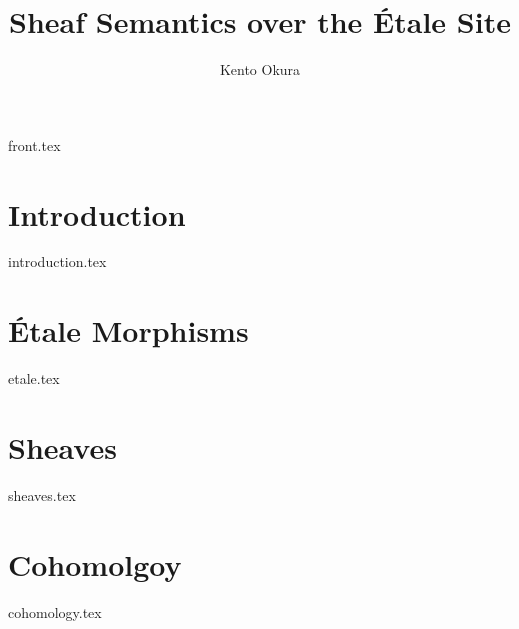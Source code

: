 \documentclass[11pt, openany]{memoir}
\title{Sheaf Semantics over the \'Etale Site}
\author{Kento Okura}
\begin{document}
\frontmatter
{front.tex}

\mainmatter

\chapter{Introduction}
{introduction.tex}

\chapter{\'Etale Morphisms}
{etale.tex}

\chapter{Sheaves}
{sheaves.tex}

\chapter{Cohomolgoy}
{cohomology.tex}



\end{document}
